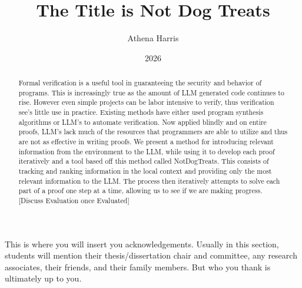 \documentclass[12pt,english,letterpaper]{kuthesis}
\author{Athena Harris}
\title{The Title is Not Dog Treats}
\date{2026}
\begin{document}
\maketitle

\begin{abstract}

Formal verification is a useful tool in guaranteeing the security and behavior of programs. This is increasingly true as the amount of LLM generated
code continues to rise. However even simple projects can be labor intensive to verify, thus verification see's little use in practice. Existing methods
have either used program synthesis algorithms or LLM's to automate verification. Now applied blindly and on entire proofs, LLM's lack much of the resources
that programmers are able to utilize and thus are not as effective in writing proofs. We present a method for introducing relevant information from the
environment to the LLM, while using it to develop each proof iteratively and a tool based off this method called {NotDogTreats}. This consists of tracking 
and ranking information in the local context and providing only the most relevant information to the LLM. The process then iteratively attempts to solve 
each part of a proof one step at a time, allowing us to see if we are making progress. [Discuss Evaluation once Evaluated]

\end{abstract}

\longstyle

\begin{acknowledgements}

This is where you will insert you acknowledgements. Usually in this section, students will mention their thesis/dissertation chair and committee, any research associates, their friends, and their family members. But who you thank is ultimately up to you.

\end{acknowledgements}

\tableofcontents{}
\listoffigures
{}
\listoftables
{}

\printglossary[title=Abbreviations, style=long,nonumberlist, type=\acronymtype]
\end{document}

